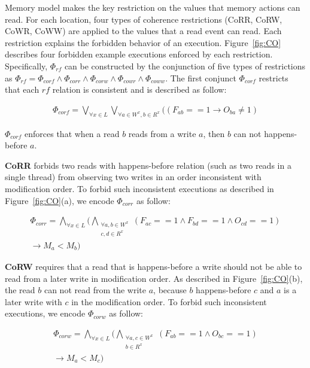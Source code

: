 \documentclass[preprint, numbers, 10pt]{sigplanconf}
\begin{document}
Memory model makes the key restriction on the values that memory actions can read. 
For each location, four types of coherence restrictions 
(CoRR, CoRW, CoWR, CoWW) are applied to the 
values that a read event can read. Each restriction explains the forbidden behavior of 
an execution. Figure~\ref{fig:CO} describes four forbidden example executions enforced
by each restriction. 
Specifically, $\Phi_{rf}$ can be constructed by the conjunction of five
types of restrictions as $\Phi_{rf}=\Phi_{corf}\wedge\Phi_{corr}\wedge \Phi_{corw}
\wedge\Phi_{cowr}\wedge\Phi_{coww}$. The first conjunct $\Phi_{corf}$ restricts that each $rf$ relation
is consistent and is described as follow: 

\begin{equation}
\begin{aligned}
\Phi_{corf} = \bigvee_{\forall x\in L }\bigvee_{\forall a\in W^x, b\in R^x} ((F_{ab}==1\rightarrow O_{ba}\neq 1) 
\end{aligned}
\end{equation} 

$\Phi_{corf}$ enforces that when a read $b$ reads from a write $a$, 
then $b$ can not happens-before $a$. 

\textbf{CoRR} forbids two reads with happens-before relation (such as two reads
in a single thread) from observing two writes in an order inconsistent with modification order. 
To forbid such inconsistent executions as described in Figure~\ref{fig:CO}(a), 
we encode $\Phi_{corr}$ as follow: 

\begin{equation}
\begin{aligned}
\Phi_{corr} = \bigwedge_{\forall x\in L}(\bigwedge_{\substack{\forall a,b\in W^x\\c,d\in R^x}} 
(F_{ac}==1\wedge F_{bd}==1\wedge O_{cd}==1) \\
\rightarrow M_{a}<M_{b})
\end{aligned}
\end{equation} 

\textbf{CoRW} requires that a read that is happens-before a 
write should not be able to read from a later write in modification order.
As described in Figure~\ref{fig:CO}(b), the read $b$ can not read from
the write $a$, because $b$ happens-before $c$ and $a$ is a later write 
with $c$ in the modification order. To forbid such inconsistent executions, we 
encode $\Phi_{corw}$ as follow: 

\begin{equation}
\begin{aligned}
\Phi_{corw} = \bigwedge_{\forall x\in L}(\bigwedge_{\substack{\forall a,c\in W^x\\b\in R^x}}
(F_{ab}==1\wedge O_{bc}==1)\\ \rightarrow M_{a}<M_{c})
\end{aligned}
\end{equation} 
\end{document}
